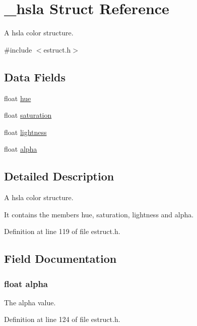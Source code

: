 \hypertarget{struct__hsla}{\section{\-\_\-hsla Struct Reference}
\label{struct__hsla}
}


A hsla color structure.  




{\ttfamily \#include $<$estruct.\-h$>$}

\subsection*{Data Fields}
\begin{DoxyCompactItemize}
\item 
float \hyperlink{struct__hsla_a408d4a7316413ec687c945201a907e98}{hue}
\item 
float \hyperlink{struct__hsla_a953351912fb6da22fde59fe0f24909e7}{saturation}
\item 
float \hyperlink{struct__hsla_a9a22c1947d9e158ae5d791807fae36ed}{lightness}
\item 
float \hyperlink{struct__hsla_ab1551d8043c2aa4410fb7dbb1fe3be7b}{alpha}
\end{DoxyCompactItemize}


\subsection{Detailed Description}
A hsla color structure. 

It contains the members hue, saturation, lightness and alpha. 

Definition at line 119 of file estruct.\-h.



\subsection{Field Documentation}
\hypertarget{struct__hsla_ab1551d8043c2aa4410fb7dbb1fe3be7b}{
\subsubsection[{alpha}]{\setlength{\rightskip}{0pt plus 5cm}float alpha}}\label{struct__hsla_ab1551d8043c2aa4410fb7dbb1fe3be7b}
The alpha value. 

Definition at line 124 of file estruct.\-h.


